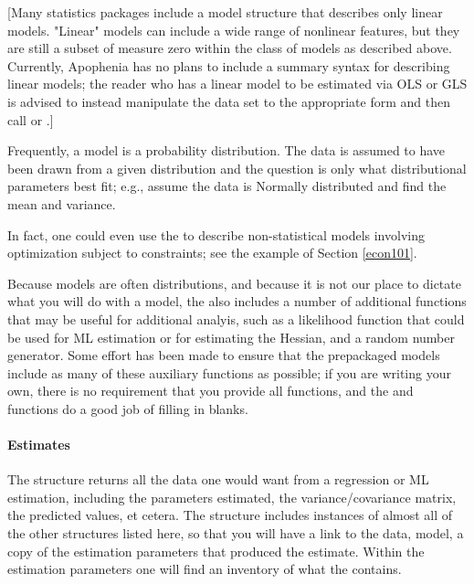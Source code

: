 [Many statistics packages include a model structure that describes only
linear models.  "Linear" models can include a wide range of nonlinear
features, but they are still a subset of measure zero within the class of
models as described above. Currently, Apophenia has no plans to include
a summary syntax for describing linear models; the reader who has a linear
model to be estimated via OLS or GLS is advised to instead manipulate
the data set to the appropriate form and then call  or
.]

Frequently, a model is a probability distribution. The data is assumed
to have been drawn from a given distribution and the question is
only what distributional parameters best fit; e.g., assume the data
is Normally distributed and find the mean and variance.

In fact, one could even use the  to describe 
non-statistical models involving optimization subject to constraints;
see the example of Section \ref{econ101}.

Because models are often distributions, and because it is not our place
to dictate what you will do with a model, the  also includes a
number of additional functions that may be useful for additional analyis,
such as a likelihood function that could be used for ML estimation or
for estimating the Hessian, and a random number generator. Some effort
has been made to ensure that the prepackaged models include as many of
these auxiliary functions as possible; if you are writing your own,
there is no requirement that you provide all functions, and the  and 
functions do a good job of filling in blanks.

\paragraph{Estimates} 
The  structure returns all the data one would want
from a regression or ML estimation, including the parameters estimated,
the variance/covariance matrix, the predicted values, et cetera. The structure
includes instances of almost all of the other structures listed here, so
that you will have a link to the data, model, a copy of the
estimation parameters that produced the estimate. Within the
estimation parameters one will find an inventory of
what the  contains.

